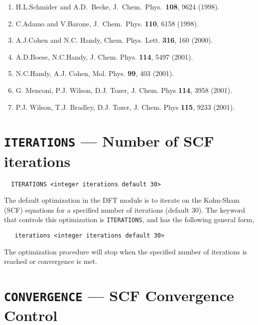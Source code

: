 {\begin{enumerate}
\item  H.L.Schmider and A.D.~Becke, J.~Chem.~Phys.~{\bf 108},
9624 (1998). \\
\item C.Adamo and V.Barone, J.~Chem.~Phys. {\bf 110}, 6158 (1998).\\
\item  A.J.Cohen and N.C. Handy, Chem. Phys. Lett. {\bf 316}, 160 (2000).\\
\item  A.D.Boese,  N.C.Handy, J. Chem. Phys. {\bf 114}, 5497
(2001). \\
\item  N.C.Handy, A.J. Cohen, Mol. Phys. {\bf 99}, 403 (2001).\\
\item G. Menconi, P.J. Wilson, D.J. Tozer, J. Chem. Phys {\bf 114}, 3958 (2001).\\
\item  P.J. Wilson, T.J. Bradley, D.J. Tozer,  J. Chem. Phys {\bf 115}, 9233 (2001).


\end{enumerate}
}
\onecolumn

\section{{\tt ITERATIONS} --- Number of SCF iterations}

\begin{verbatim}
  ITERATIONS <integer iterations default 30>
\end{verbatim}

The default optimization in the DFT module is to iterate on the 
Kohn-Sham (SCF) equations for a specified number of iterations
(default 30).  The keyword that controls this optimization 
is \verb+ITERATIONS+, and has the following general form,

\begin{verbatim}
   iterations <integer iterations default 30>
\end{verbatim}

The optimization procedure will stop when the specified number of
iterations is reached or convergence is met.

\section{{\tt CONVERGENCE} --- SCF Convergence Control}

